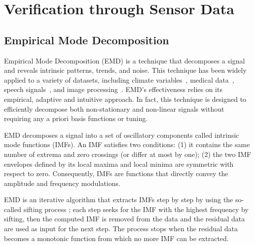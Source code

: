 \section{Verification through Sensor Data}

\subsection{Empirical Mode Decomposition} \label{emd}
Empirical Mode Decomposition (EMD) \cite{huang:emd1998} is a technique that decomposes a signal and reveals intrinsic patterns, 
trends, and noise.
This technique has been widely applied to a variety of datasets, including climate variables~\cite{lee:climateEMD2011}, medical data~\cite{blanco:bioMed2008}, speech signals~\cite{huang:signalProc2006,hasan:ieeeletter2009}, and image processing~\cite{nunes:vision2005}.
EMD's effectiveness relies on its empirical, adaptive and intuitive approach.
In fact, this technique is designed to efficiently decompose both non-stationary and non-linear signals without requiring any 
a priori basis functions or tuning.  

EMD decomposes a signal into a set of oscillatory components called intrinsic mode functions (IMFs). 
An IMF satisfies two conditions: (1) it contains the same number of extrema and zero crossings (or differ at most by one); (2) the two 
IMF envelopes defined by its local maxima and local minima are symmetric with respect to zero.  Consequently, 
 IMFs are functions that directly convey the amplitude and frequency modulations.

EMD is an iterative algorithm that extracts IMFs step by step by using the so-called sifting process \cite{huang:emd1998}; each step seeks for the IMF with the highest frequency by sifting, then the computed IMF is removed from the data and the residual data are used as input for the 
next step.
The process stops when the residual data becomes a monotonic function from which no more IMF can be extracted.

